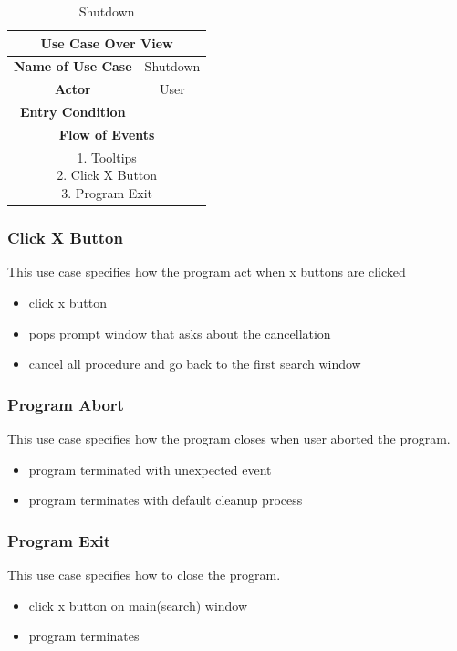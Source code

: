 \documentclass[conference]{IEEEtran}
\begin{document}
\begin{table}[hbt]
\renewcommand{\arraystretch}{1}
\caption{Shutdown}
\label{table:usecase4}
\centering
\begin{adjustbox}{width=0.4\textwidth}
\small
\begin{tabular}{c|c}
\hline
\multicolumn{2}{c}{\textbf{Use Case Over View}} \\
\hline
\textbf{Name of Use Case} & Shutdown\\
\hline
\textbf{Actor} & User \\
\hline
\textbf{Entry Condition} & \\
\hline
\multicolumn{2}{c}{\textbf{Flow of Events}}\\
\hline
\multicolumn{2}{c}{
\parbox[t]{5cm}{
  1. Tooltips \\
  2. Click X Button \\
  3. Program Exit
  }
}\\
\hline

\end{tabular}
\end{adjustbox}
\end{table}


\subsubsection{Click X Button}
This use case specifies how the program act when x buttons are clicked
\begin{itemize}
  \item click x button
  \item pops prompt window that asks about the cancellation
  \item cancel all procedure and go back to the first search window
\end{itemize}
\textit{}

\subsubsection{Program Abort}
This use case specifies how the program closes when user aborted the program.
\begin{itemize}
  \item program terminated with unexpected event
  \item program terminates with default cleanup process
\end{itemize}

\subsubsection{Program Exit}
This use case specifies how to close the program.
\begin{itemize}
  \item click x button on main(search) window
  \item program terminates
\end{itemize}
\textit{}
\end{document}
